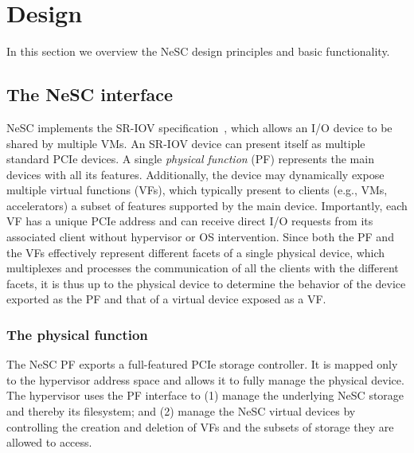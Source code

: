 \section{Design}
\label{sec:design}

In this section we overview the NeSC design principles and basic functionality. 

\subsection{The NeSC interface}
NeSC implements the SR-IOV specification~\cite{pcisigiov}, which allows an I/O device to be shared by multiple VMs.
An SR-IOV device can present itself as multiple standard PCIe devices. A single \emph{physical function} (PF) represents the main devices with all its features. Additionally, the device may dynamically expose multiple {virtual functions} (VFs), which typically present to clients (e.g., VMs, accelerators) a subset of features supported by the main device. Importantly, each VF has a unique PCIe address and can receive direct I/O requests from its associated client without hypervisor or OS intervention.
%
Since both the PF and the VFs effectively represent different facets of a single physical device, which multiplexes and processes the communication of all the clients with the different facets, it is thus up to the physical device to determine the behavior of the device exported as the PF
and that of a virtual device exposed as a VF.

\subsubsection*{The physical function}
The NeSC PF exports a full-featured PCIe storage controller. It is mapped only to the hypervisor address space and allows it to fully manage the physical  device.
The hypervisor uses the PF interface to
(1) manage the underlying NeSC storage and thereby its filesystem;
and (2) manage the NeSC virtual devices by controlling the creation and deletion of VFs and the subsets of storage they are allowed to access.

